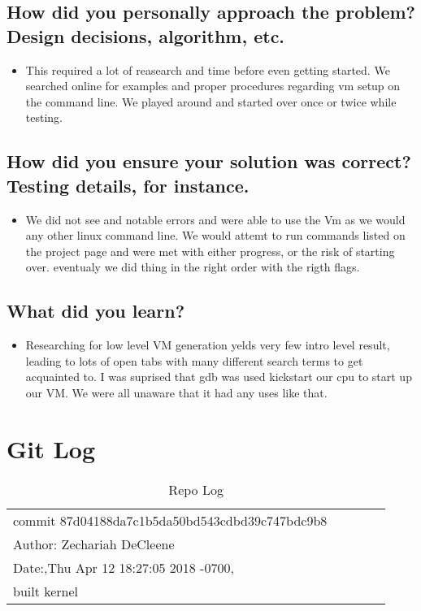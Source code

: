 \documentclass[a4paper, 10pt, draftclsnofoot, onecolumn]{article}
\begin{document}
\subsection{How did you personally approach the problem? Design decisions, algorithm, etc.}
\begin{itemize}
\item This required a lot of reasearch and time before even getting started. We searched online for examples and proper procedures regarding vm setup on the command line. We played around and started over once or twice while testing. 
\end{itemize}

\subsection{How did you ensure your solution was correct? Testing details, for instance.}
\begin{itemize}
\item We did not see and notable errors and were able to use the Vm as we would any other linux command line. We would attemt to run  commands listed on the project page and were met with either progress, or the risk of starting over. eventualy we did thing in the right order with the rigth flags. 
\end{itemize}

\subsection{What did you learn?}
\begin{itemize}
\item Researching for low level VM generation yelds very few intro level result, leading to lots of open tabs with many different search terms to get acquainted to. I was suprised that gdb was used kickstart our cpu to start up our VM. We were all unaware that it had any uses like that. 
\end{itemize}

\section{Git Log}
\begin{table}[h]
\centering
\caption{Repo Log}
\label{my-label}
\begin{tabular}{lllll}
commit 87d04188da7c1b5da50bd543cdbd39c747bdc9b8 &  &  &  &  \\
	Author: Zechariah DeCleene                      &  &  &  &  \\
	Date:,Thu Apr 12 18:27:05 2018 -0700,           &  &  &  &  \\
	built kernel                                    &  &  &  & 
\end{tabular}
\end{table}
\end{document}

